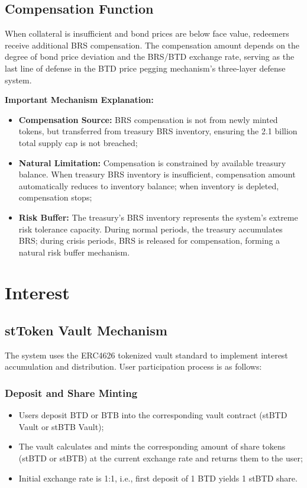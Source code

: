 \documentclass{article}
\begin{document}
\subsection{Compensation Function}
When collateral is insufficient and bond prices are below face value, redeemers receive additional BRS compensation. The compensation amount depends on the degree of bond price deviation and the BRS/BTD exchange rate, serving as the last line of defense in the BTD price pegging mechanism's three-layer defense system.

\textbf{Important Mechanism Explanation:}
\begin{itemize}
  \item \textbf{Compensation Source:} BRS compensation is not from newly minted tokens, but transferred from treasury BRS inventory, ensuring the 2.1 billion total supply cap is not breached;
  \item \textbf{Natural Limitation:} Compensation is constrained by available treasury balance. When treasury BRS inventory is insufficient, compensation amount automatically reduces to inventory balance; when inventory is depleted, compensation stops;
  \item \textbf{Risk Buffer:} The treasury's BRS inventory represents the system's extreme risk tolerance capacity. During normal periods, the treasury accumulates BRS; during crisis periods, BRS is released for compensation, forming a natural risk buffer mechanism.
\end{itemize}

\section{Interest}
\subsection{stToken Vault Mechanism}
The system uses the ERC4626 tokenized vault standard to implement interest accumulation and distribution. User participation process is as follows:

\subsubsection{Deposit and Share Minting}
\begin{itemize}
  \item Users deposit BTD or BTB into the corresponding vault contract (stBTD Vault or stBTB Vault);
  \item The vault calculates and mints the corresponding amount of share tokens (stBTD or stBTB) at the current exchange rate and returns them to the user;
  \item Initial exchange rate is 1:1, i.e., first deposit of 1 BTD yields 1 stBTD share.
\end{itemize}
\end{document}
